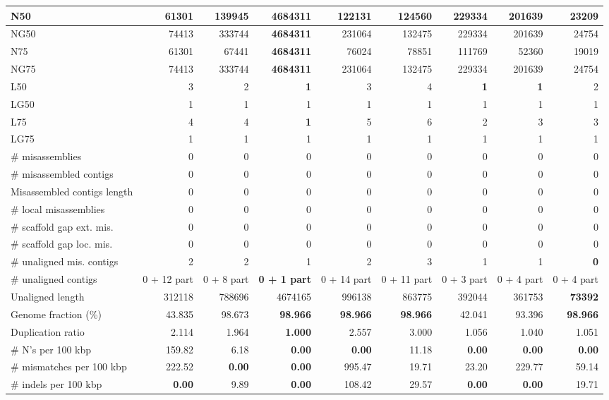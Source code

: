 \documentclass[12pt,a4paper]{article}
\begin{document}
\begin{table}[ht]
\begin{center}
\begin{tabular}{|l*{8}{|r}|}
N50 & 61301 & 139945 & {\bf 4684311} & 122131 & 124560 & 229334 & 201639 & 23209 \\ \hline
NG50 & 74413 & 333744 & {\bf 4684311} & 231064 & 132475 & 229334 & 201639 & 24754 \\ \hline
N75 & 61301 & 67441 & {\bf 4684311} & 76024 & 78851 & 111769 & 52360 & 19019 \\ \hline
NG75 & 74413 & 333744 & {\bf 4684311} & 231064 & 132475 & 229334 & 201639 & 24754 \\ \hline
L50 & 3 & 2 & {\bf 1} & 3 & 4 & {\bf 1} & {\bf 1} & 2 \\ \hline
LG50 & 1 & 1 & 1 & 1 & 1 & 1 & 1 & 1 \\ \hline
L75 & 4 & 4 & {\bf 1} & 5 & 6 & 2 & 3 & 3 \\ \hline
LG75 & 1 & 1 & 1 & 1 & 1 & 1 & 1 & 1 \\ \hline
\# misassemblies & 0 & 0 & 0 & 0 & 0 & 0 & 0 & 0 \\ \hline
\# misassembled contigs & 0 & 0 & 0 & 0 & 0 & 0 & 0 & 0 \\ \hline
Misassembled contigs length & 0 & 0 & 0 & 0 & 0 & 0 & 0 & 0 \\ \hline
\# local misassemblies & 0 & 0 & 0 & 0 & 0 & 0 & 0 & 0 \\ \hline
\# scaffold gap ext. mis. & 0 & 0 & 0 & 0 & 0 & 0 & 0 & 0 \\ \hline
\# scaffold gap loc. mis. & 0 & 0 & 0 & 0 & 0 & 0 & 0 & 0 \\ \hline
\# unaligned mis. contigs & 2 & 2 & 1 & 2 & 3 & 1 & 1 & {\bf 0} \\ \hline
\# unaligned contigs & 0 + 12 part & 0 + 8 part & {\bf 0 + 1 part} & 0 + 14 part & 0 + 11 part & 0 + 3 part & 0 + 4 part & 0 + 4 part \\ \hline
Unaligned length & 312118 & 788696 & 4674165 & 996138 & 863775 & 392044 & 361753 & {\bf 73392} \\ \hline
Genome fraction (\%) & 43.835 & 98.673 & {\bf 98.966} & {\bf 98.966} & {\bf 98.966} & 42.041 & 93.396 & {\bf 98.966} \\ \hline
Duplication ratio & 2.114 & 1.964 & {\bf 1.000} & 2.557 & 3.000 & 1.056 & 1.040 & 1.051 \\ \hline
\# N's per 100 kbp & 159.82 & 6.18 & {\bf 0.00} & {\bf 0.00} & 11.18 & {\bf 0.00} & {\bf 0.00} & {\bf 0.00} \\ \hline
\# mismatches per 100 kbp & 222.52 & {\bf 0.00} & {\bf 0.00} & 995.47 & 19.71 & 23.20 & 229.77 & 59.14 \\ \hline
\# indels per 100 kbp & {\bf 0.00} & 9.89 & {\bf 0.00} & 108.42 & 29.57 & {\bf 0.00} & {\bf 0.00} & 19.71 \\ \hline

\end{tabular}
\end{center}
\end{table}
\end{document}
